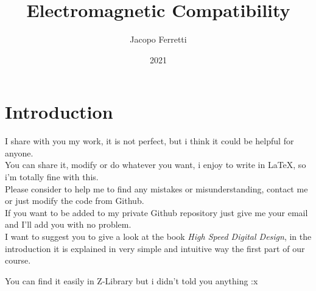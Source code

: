 \documentclass{article}
\title{Electromagnetic Compatibility}
\date{2021}
\author{Jacopo Ferretti}
\numberwithin{equation}{section}
\numberwithin{figure}{section}
\begin{document}
\maketitle
\begin{center}
  \Huge{}
\end{center}
\newpage
\tableofcontents
\newpage
\section*{Introduction}
I share with you my work, it is not perfect, but i think it could be helpful for anyone.\\
You can share it, modify or do whatever you want, i enjoy to write in \LaTeX, so i'm totally fine with this.\\
Please consider to help me to find any mistakes or misunderstanding, contact me or just modify the code from Github.\\
If you want to be added to my private Github repository just give me your email and I'll add you with no problem.\\
I want to suggest you to give a look at the book \emph{High Speed Digital Design}\cite{zhang_book}, in the introduction it is explained in very simple and intuitive way the first part of our course.\\
\begin{footnotesize}
  You can find it easily in Z-Library but i didn't told you anything :x
\end{footnotesize}
\newpage











\medskip


\end{document}
